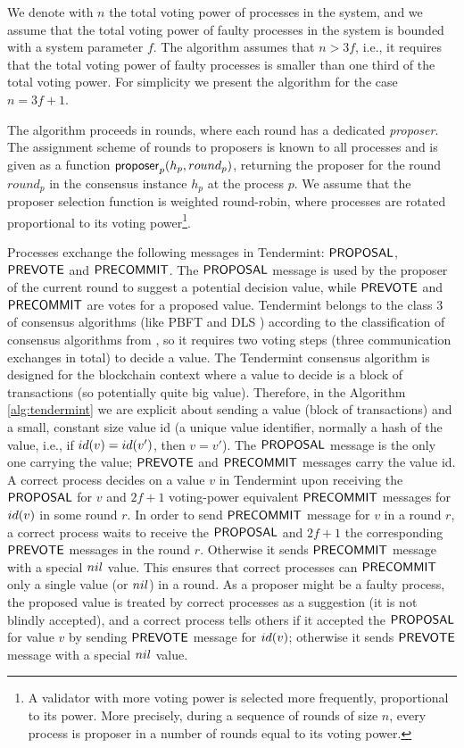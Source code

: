 We denote with $n$ the total voting power of processes in the system, and we assume that the total voting power of faulty processes in the system is bounded with a system parameter $f$. 
The algorithm assumes that $n > 3f$, i.e., it requires that the total voting power of faulty processes is smaller than one third of the total voting power. For simplicity we present the algorithm for the case $n = 3f + 1$.

The algorithm proceeds in rounds, where each round has a dedicated \emph{proposer}. The assignment scheme of rounds to proposers is known to all processes and is given as a function $\mathsf{proposer}_p(h_p, round_p)$, returning the proposer for the round $round_p$ in the consensus instance $h_p$ at the process $p$. We assume that the proposer selection function is weighted round-robin, where processes are rotated proportional to its voting power\footnote{A validator with more voting power is selected more frequently, proportional to its power. More precisely, during a sequence of rounds of size $n$, every process is proposer in a number of rounds equal to its voting power.}. 

Processes exchange the following messages in Tendermint: $\mathsf{PROPOSAL}$, $\mathsf{PREVOTE}$ and $\mathsf{PRECOMMIT}$. The 
$\mathsf{PROPOSAL}$ message is used by the proposer of the current round to suggest a potential decision value, while 
$\mathsf{PREVOTE}$ and $\mathsf{PRECOMMIT}$ are votes for a proposed value. Tendermint belongs to the class 3 of consensus algorithms (like PBFT \cite{CL02:tcs} and DLS \cite{DLS88:jacm}) according to the classification of consensus algorithms from \cite{RMS10:dsn}, so it requires two voting steps (three communication exchanges in total) to decide a value. The Tendermint consensus algorithm is designed for the blockchain context where a value to decide is a block of transactions (so potentially quite big value). Therefore, in the Algorithm \ref{alg:tendermint} we are explicit about sending a value (block of transactions) and a small, constant size value id (a unique value identifier, normally a hash of the value, i.e., if $id(v) = id(v')$, then $v=v'$). The $\mathsf{PROPOSAL}$ message is the only one carrying the value; $\mathsf{PREVOTE}$ and $\mathsf{PRECOMMIT}$ messages carry the value id. 
A correct process decides on a value $v$ in Tendermint upon receiving the $\mathsf{PROPOSAL}$ for $v$ and $2f+1$ voting-power equivalent $\mathsf{PRECOMMIT}$ messages for $id(v)$ in some round $r$. In order to send $\mathsf{PRECOMMIT}$ message for $v$ in a round $r$, a correct process waits to receive the $\mathsf{PROPOSAL}$ and $2f+1$ the corresponding $\mathsf{PREVOTE}$ messages in the round $r$. Otherwise it sends $\mathsf{PRECOMMIT}$ message with a special $nil$ value.  This ensures that correct processes can $\mathsf{PRECOMMIT}$ only a single value (or $nil$) in a round. 
As a proposer might be a faulty process, the proposed value is treated by correct processes as a suggestion (it is not blindly accepted), and a correct process tells others if it accepted the $\mathsf{PROPOSAL}$ for value $v$ by sending $\mathsf{PREVOTE}$ message for $id(v)$; otherwise it sends $\mathsf{PREVOTE}$ message with a special $nil$ value. 

